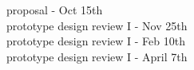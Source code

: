 \thispagestyle{empty}

proposal - Oct 15th\\
prototype design review I - Nov 25th\\
prototype design review I - Feb 10th\\
prototype design review I - April 7th\\
